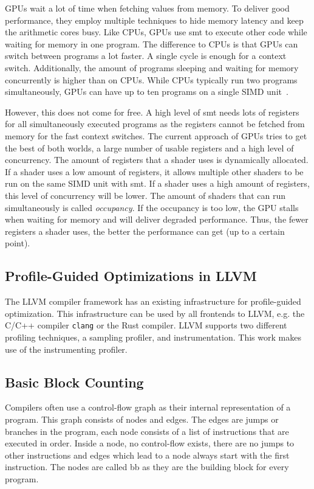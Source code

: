 GPUs wait a lot of time when fetching values from memory. To deliver good performance, they employ multiple techniques to hide memory latency and keep the arithmetic cores busy.
Like CPUs, GPUs use \gls{smt} to execute other code while waiting for memory in one program.
The difference to CPUs is that GPUs can switch between programs a lot faster. A single cycle is enough for a context switch.
Additionally, the amount of programs sleeping and waiting for memory concurrently is higher than on CPUs.
While CPUs typically run two programs simultaneously, GPUs can have up to ten programs on a single SIMD unit~\cite{Aaltonen2017}.

However, this does not come for free. A high level of \gls{smt} needs lots of registers for all simultaneously executed programs as the registers cannot be fetched from memory for the fast context switches.
The current approach of GPUs tries to get the best of both worlds, a large number of usable registers and a high level of concurrency.
The amount of registers that a shader uses is dynamically allocated.
If a shader uses a low amount of registers, it allows multiple other shaders to be run on the same SIMD unit with \gls{smt}.
If a shader uses a high amount of registers, this level of concurrency will be lower.
The amount of shaders that can run simultaneously is called \emph{occupancy}.
If the occupancy is too low, the GPU stalls when waiting for memory and will deliver degraded performance.
Thus, the fewer registers a shader uses, the better the performance can get (up to a certain point).

\subsection{Profile-Guided Optimizations in LLVM}
\label{sub:pgo-background}
The LLVM compiler framework has an existing infrastructure for profile-guided optimization. This infrastructure can be used by all frontends to LLVM, e.g. the C/C++ compiler \texttt{clang} or the Rust compiler. LLVM supports two different profiling techniques, a sampling profiler, and instrumentation.
This work makes use of the instrumenting profiler.

\subsection{Basic Block Counting}
\label{sub:counter-instrumentation}
Compilers often use a control-flow graph as their internal representation of a program.
This graph consists of nodes and edges. The edges are jumps or branches in the program, each node consists of a list of instructions that are executed in order.
Inside a node, no control-flow exists, there are no jumps to other instructions and edges which lead to a node always start with the first instruction.
The nodes are called \acrfull{bb} as they are the building block for every program.

